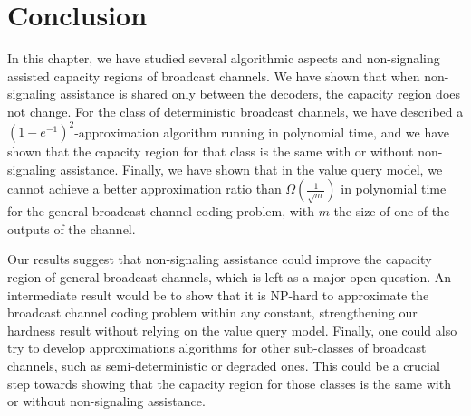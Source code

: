 \section{Conclusion}
In this chapter, we have studied several algorithmic aspects and non-signaling assisted capacity regions of broadcast channels. We have shown that when non-signaling assistance is shared only between the decoders, the capacity region does not change. For the class of deterministic broadcast channels, we have described a $(1-e^{-1})^2$-approximation algorithm running in polynomial time, and we have shown that the capacity region for that class is the same with or without non-signaling assistance. Finally, we have shown that in the value query model, we cannot achieve a better approximation ratio than $\Omega\left(\frac{1}{\sqrt{m}}\right)$ in polynomial time for the general broadcast channel coding problem, with $m$ the size of one of the outputs of the channel.

Our results suggest that non-signaling assistance could improve the capacity region of general broadcast channels, which is left as a major open question. An intermediate result would be to show that it is \textrm{NP}-hard to approximate the broadcast channel coding problem within any constant, strengthening our hardness result without relying on the value query model. Finally, one could also try to develop approximations algorithms for other sub-classes of broadcast channels, such as semi-deterministic or degraded ones. This could be a crucial step towards showing that the capacity region for those classes is the same with or without non-signaling assistance.
